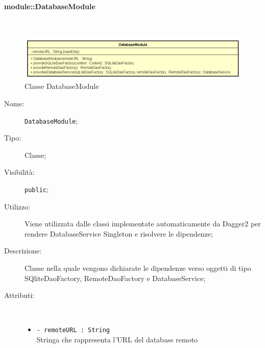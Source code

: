 \documentclass[../DefinizioneDiProdotto.tex]{subfiles}
\begin{document}
\paragraph{module::DatabaseModule}
\
\begin{figure}[H]
	\centering
	\includegraphics[width=\maxwidth]{img/DatabaseModule.png}
	\caption{Classe DatabaseModule}\label{fig:module::DatabaseModule} 
\end{figure}
\begin{description}
	\item[Nome:] \texttt{DatabaseModule};
	\item[Tipo:] Classe;
	\item[Visibilità:] \texttt{public};
	\item[Utilizzo:] Viene utilizzata dalle classi implementate automaticamente da Dagger2 per rendere DatabaseService Singleton e risolvere le dipendenze;
	\item[Descrizione:] Classe nella quale vengono dichiarate le dipendenze verso oggetti di tipo SQliteDaoFactory,
	RemoteDaoFactory e DatabaseService;
	\item[Attributi:] \
	\begin{itemize}
		\item \texttt{- remoteURL : String}\\
		Stringa che rappresenta l'URL del database remoto
		

\end{itemize}
\end{description}
\end{document}
